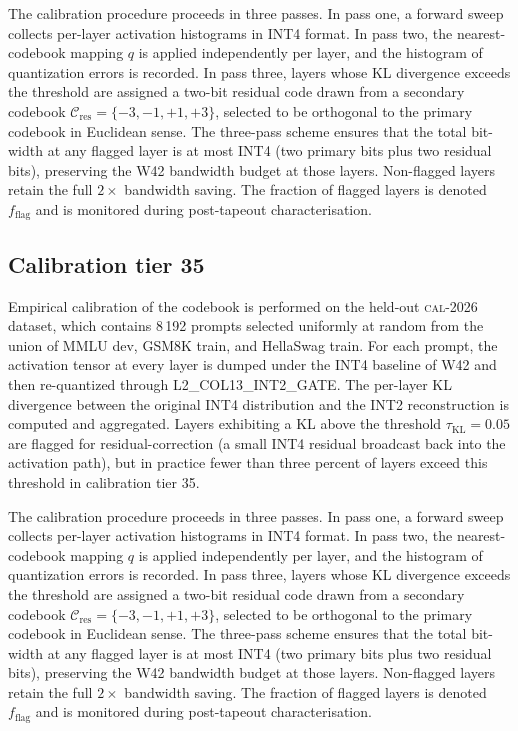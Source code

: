 The calibration procedure proceeds in three passes. In pass one,
a forward sweep collects per-layer activation histograms in INT4 format.
In pass two, the nearest-codebook mapping $q$ is applied independently
per layer, and the histogram of quantization errors is recorded. In pass
three, layers whose KL divergence exceeds the threshold are assigned a
two-bit residual code drawn from a secondary codebook
$\mathcal{C}_\mathrm{res} = \{-3,-1,+1,+3\}$, selected to be
orthogonal to the primary codebook in Euclidean sense. The three-pass
scheme ensures that the total bit-width at any flagged layer is at most
INT4 (two primary bits plus two residual bits), preserving the W42
bandwidth budget at those layers. Non-flagged layers retain the full
$2\times$ bandwidth saving. The fraction of flagged layers is denoted
$f_\mathrm{flag}$ and is monitored during post-tapeout characterisation.


\subsection{Calibration tier 35}

Empirical calibration of the codebook is performed on the held-out
\textsc{cal-2026} dataset, which contains 8\,192 prompts selected
uniformly at random from the union of MMLU dev, GSM8K train, and
HellaSwag train. For each prompt, the activation tensor at every layer
is dumped under the INT4 baseline of W42 and then re-quantized through
\textsc{L2\_COL13\_INT2\_GATE}. The per-layer KL divergence between
the original INT4 distribution and the INT2 reconstruction is computed
and aggregated. Layers exhibiting a KL above the threshold
$\tau_{\mathrm{KL}} = 0.05$ are flagged for residual-correction (a
small INT4 residual broadcast back into the activation path), but in
practice fewer than three percent of layers exceed this threshold in
calibration tier 35.

The calibration procedure proceeds in three passes. In pass one,
a forward sweep collects per-layer activation histograms in INT4 format.
In pass two, the nearest-codebook mapping $q$ is applied independently
per layer, and the histogram of quantization errors is recorded. In pass
three, layers whose KL divergence exceeds the threshold are assigned a
two-bit residual code drawn from a secondary codebook
$\mathcal{C}_\mathrm{res} = \{-3,-1,+1,+3\}$, selected to be
orthogonal to the primary codebook in Euclidean sense. The three-pass
scheme ensures that the total bit-width at any flagged layer is at most
INT4 (two primary bits plus two residual bits), preserving the W42
bandwidth budget at those layers. Non-flagged layers retain the full
$2\times$ bandwidth saving. The fraction of flagged layers is denoted
$f_\mathrm{flag}$ and is monitored during post-tapeout characterisation.


